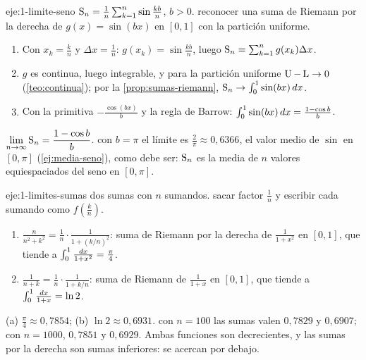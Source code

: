 \begin{solucion}{eje:1-limite-seno}
\datos $\operatorname{S}_n=\frac1n\sum_{k=1}^{n}\sin\frac{kb}{n}$, $b>0$.
\planteamiento reconocer una suma de Riemann por la derecha de $g(x)=\sin(bx)$ en $[0,1]$ con la partición uniforme.
\pasos
\begin{enumerate}[label=\arabic*.]
  \item Con $x_k=\frac kn$ y $\Delta x=\frac1n$: $g(x_k)=\sin\frac{kb}{n}$, luego $\operatorname{S}_n=\sum_{k=1}^{n}g(x_k)\Delta x$.
  \item $g$ es continua, luego integrable, y para la partición uniforme $\operatorname{U}-\operatorname{L}\to0$ (\cref{teo:continua}); por la \cref{prop:sumas-riemann}, $\operatorname{S}_n\to\int_0^{1}\sin(bx)\mathop{}\!d x$.
  \item Con la primitiva $-\frac{\cos(bx)}{b}$ y la regla de Barrow: $\int_0^{1}\sin(bx)\mathop{}\!d x=\frac{1-\cos b}{b}$.
\end{enumerate}
\resultado $\displaystyle\lim_{n\to\infty}\operatorname{S}_n=\frac{1-\cos b}{b}$.
\comprobacion con $b=\pi$ el límite es $\frac2\pi\approx0{,}6366$, el valor medio de $\sin$ en $[0,\pi]$ (\cref{ej:media-seno}), como debe ser: $\operatorname{S}_n$ es la media de $n$ valores equiespaciados del seno en $[0,\pi]$.
\end{solucion}

\begin{solucion}{eje:1-limites-sumas}
\datos dos sumas con $n$ sumandos.
\planteamiento sacar factor $\frac1n$ y escribir cada sumando como $f(\frac kn)$.
\pasos
\begin{enumerate}[label=(\alph*)]
  \item $\frac{n}{n^{2}+k^{2}}=\frac1n\cdot\frac{1}{1+(k/n)^{2}}$: suma de Riemann por la derecha de $\frac{1}{1+x^{2}}$ en $[0,1]$, que tiende a $\int_0^{1}\frac{\mathop{}\!d x}{1+x^{2}}=\frac\pi4$.
  \item $\frac{1}{n+k}=\frac1n\cdot\frac{1}{1+k/n}$: suma de Riemann de $\frac{1}{1+x}$ en $[0,1]$, que tiende a $\int_0^{1}\frac{\mathop{}\!d x}{1+x}=\ln2$.
\end{enumerate}
\resultado (a) $\frac\pi4\approx0{,}7854$; (b) $\ln2\approx0{,}6931$.
\comprobacion con $n=100$ las sumas valen $0{,}7829$ y $0{,}6907$; con $n=1000$, $0{,}7851$ y $0{,}6929$. Ambas funciones son decrecientes, y las sumas por la derecha son sumas inferiores: se acercan por debajo.
\end{solucion}

